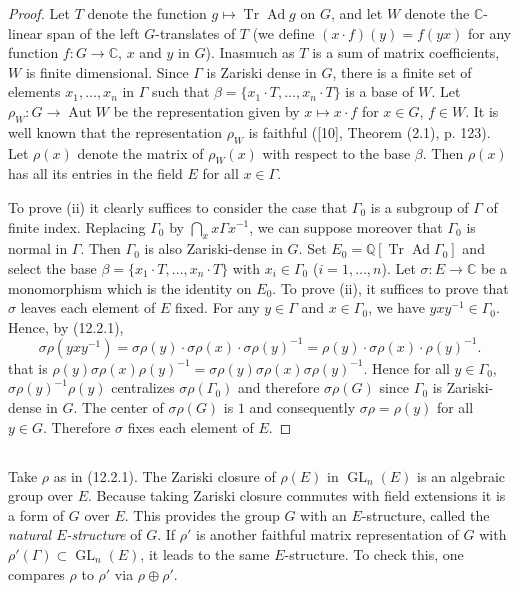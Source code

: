 \documentclass[12pt,a4paper]{article}
\theoremstyle{plain}
\theoremstyle{definition}
\theoremstyle{remark}
\DeclareMathOperator{\Aut}{Aut}
\DeclareMathOperator{\Tr}{Tr}
\DeclareMathOperator{\Ad}{Ad}
\DeclareMathOperator{\GL}{GL}
\begin{document}
\begin{proof}
Let $T$ denote the function $g \mapsto \Tr \Ad g$ on $G$, and let $W$ denote the $\mathbb{C}$-linear span of the left $G$-translates of $T$ (we define $(x \cdot f)(y) = f(yx)$ for any function $f : G \to \mathbb{C}$, $x$ and $y$ in $G$). Inasmuch as $T$ is a sum of matrix coefficients, $W$ is finite dimensional. Since $\Gamma$ is Zariski dense in $G$, there is a finite set of elements $x_1, \ldots, x_n$ in $\Gamma$ such that $\beta = \{x_1 \cdot T, \ldots, x_n \cdot T\}$ is a base of $W$. Let $\rho_W : G \to \Aut W$ be the representation given by $x \mapsto x \cdot f$ for $x \in G$, $f \in W$. It is well known that the representation $\rho_W$ is faithful ([10], Theorem (2.1), p. 123). Let $\rho(x)$ denote the matrix of $\rho_W(x)$ with respect to the base $\beta$. Then $\rho(x)$ has all its entries in the field $E$ for all $x \in \Gamma$.

To prove (ii) it clearly suffices to consider the case that $\Gamma_0$ is a subgroup of $\Gamma$ of finite index. Replacing $\Gamma_0$ by $\bigcap_x x\Gamma x^{-1}$, we can suppose moreover that $\Gamma_0$ is normal in $\Gamma$. Then $\Gamma_0$ is also Zariski-dense in $G$. Set $E_0 = \mathbb{Q}[\Tr \Ad \Gamma_0]$ and select the base $\beta = \{x_1 \cdot T, \ldots, x_n \cdot T\}$ with $x_i \in \Gamma_0$ ($i = 1, \ldots, n$). Let $\sigma : E \to \mathbb{C}$ be a monomorphism which is the identity on $E_0$. To prove (ii), it suffices to prove that $\sigma$ leaves each element of $E$ fixed. For any $y \in \Gamma$ and $x \in \Gamma_0$, we have $yxy^{-1} \in \Gamma_0$. Hence, by (12.2.1),
\[
\sigma \rho(yxy^{-1}) = \sigma \rho(y) \cdot \sigma \rho(x) \cdot \sigma \rho(y)^{-1} = \rho(y) \cdot \sigma \rho(x) \cdot \rho(y)^{-1}.
\]
that is $\rho(y) \sigma \rho(x) \rho(y)^{-1} = \sigma \rho(y) \sigma \rho(x) \sigma \rho(y)^{-1}$. Hence for all $y \in \Gamma_0$, $\sigma \rho(y)^{-1}\rho(y)$ centralizes $\sigma \rho(\Gamma_0)$ and therefore $\sigma \rho(G)$ since $\Gamma_0$ is Zariski-dense in $G$. The center of $\sigma \rho(G)$ is $1$ and consequently $\sigma \rho = \rho(y)$ for all $y \in G$. Therefore $\sigma$ fixes each element of $E$.
\end{proof}

\subsection{}
\label{12.2.2}

Take $\rho$ as in (12.2.1). The Zariski closure of $\rho(E)$ in $\GL_n(E)$ is an algebraic group over $E$. Because taking Zariski closure commutes with field extensions it is a form of $G$ over $E$. This provides the group $G$ with an $E$-structure, called the \emph{natural $E$-structure} of $G$. If $\rho'$ is another faithful matrix representation of $G$ with $\rho'(\Gamma) \subset \GL_n(E)$, it leads to the same $E$-structure. To check this, one compares $\rho$ to $\rho'$ via $\rho \oplus \rho'$.
\end{document}
